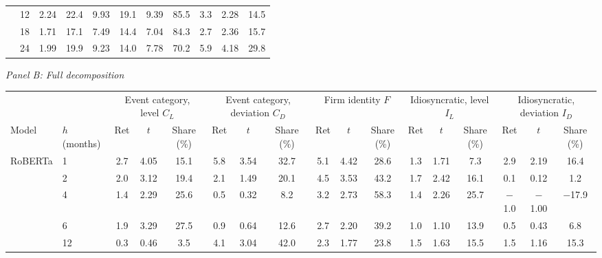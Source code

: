 \begin{table}[htbp]
{\begin{adjustbox}{max width=\linewidth, max totalheight=0.28\textheight}
\begin{tabular}{llccccccccc}
 & 12 & 2.24 & 22.4 & \phantom{0}9.93 & 19.1 & \phantom{0}9.39 & \phantom{0}85.5 & \phantom{$-$}3.3 & \phantom{$-$}2.28 & \phantom{$-$}14.5 \\
 & 18 & 1.71 & 17.1 & \phantom{0}7.49 & 14.4 & \phantom{0}7.04 & \phantom{0}84.3 & \phantom{$-$}2.7 & \phantom{$-$}2.36 & \phantom{$-$}15.7 \\
 & 24 & 1.99 & 19.9 & \phantom{0}9.23 & 14.0 & \phantom{0}7.78 & \phantom{0}70.2 & \phantom{$-$}5.9 & \phantom{$-$}4.18 & \phantom{$-$}29.8 \\
\bottomrule
\end{tabular}
\end{adjustbox}
\par\medskip
\textit{Panel B: Full decomposition}\\[2pt]
\begin{adjustbox}{max width=\linewidth, max totalheight=0.28\textheight}
\begin{tabular}{llccccccccccccccc}
\toprule
\multicolumn{2}{c}{} & \multicolumn{3}{c}{Event category, level $C_L$} & \multicolumn{3}{c}{Event category, deviation $C_D$} & \multicolumn{3}{c}{Firm identity $F$} & \multicolumn{3}{c}{Idiosyncratic, level $I_L$} & \multicolumn{3}{c}{Idiosyncratic, deviation $I_D$} \\
\cmidrule(lr){3-5} \cmidrule(lr){6-8} \cmidrule(lr){9-11} \cmidrule(lr){12-14} \cmidrule(lr){15-17}
Model & $h$ (months) & Ret & $t$ & Share (\%) & Ret & $t$ & Share (\%) & Ret & $t$ & Share (\%) & Ret & $t$ & Share (\%) & Ret & $t$ & Share (\%) \\
\midrule
RoBERTa & 1 & 2.7 & 4.05 & 15.1 & \phantom{$-$}5.8 & \phantom{$-$}3.54 & \phantom{$-$}32.7 & \phantom{0}5.1 & \phantom{0}4.42 & 28.6 & 1.3 & 1.71 & \phantom{0}7.3 & \phantom{$-$}2.9 & \phantom{$-$}2.19 & \phantom{$-$}16.4 \\
 & 2 & 2.0 & 3.12 & 19.4 & \phantom{$-$}2.1 & \phantom{$-$}1.49 & \phantom{$-$}20.1 & \phantom{0}4.5 & \phantom{0}3.53 & 43.2 & 1.7 & 2.42 & 16.1 & \phantom{$-$}0.1 & \phantom{$-$}0.12 & \phantom{$-$0}1.2 \\
 & 4 & 1.4 & 2.29 & 25.6 & \phantom{$-$}0.5 & \phantom{$-$}0.32 & \phantom{$-$0}8.2 & \phantom{0}3.2 & \phantom{0}2.73 & 58.3 & 1.4 & 2.26 & 25.7 & $-$1.0 & $-$1.00 & $-$17.9 \\
 & 6 & 1.9 & 3.29 & 27.5 & \phantom{$-$}0.9 & \phantom{$-$}0.64 & \phantom{$-$}12.6 & \phantom{0}2.7 & \phantom{0}2.20 & 39.2 & 1.0 & 1.10 & 13.9 & \phantom{$-$}0.5 & \phantom{$-$}0.43 & \phantom{$-$0}6.8 \\
 & 12 & 0.3 & 0.46 & \phantom{0}3.5 & \phantom{$-$}4.1 & \phantom{$-$}3.04 & \phantom{$-$}42.0 & \phantom{0}2.3 & \phantom{0}1.77 & 23.8 & 1.5 & 1.63 & 15.5 & \phantom{$-$}1.5 & \phantom{$-$}1.16 & \phantom{$-$}15.3 \\

\end{tabular}
\end{adjustbox}}
\end{table}
